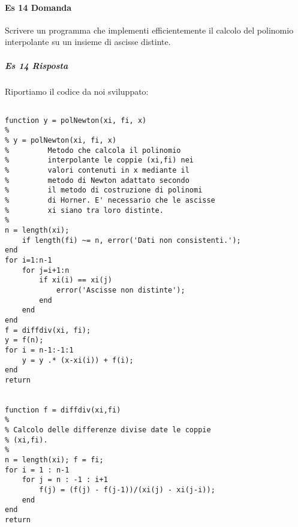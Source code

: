 \documentclass[a4paper]{report}
\begin{document}
\paragraph{Es 14 Domanda}
Scrivere un programma che implementi efficientemente il calcolo del polinomio interpolante su un insieme di ascisse distinte.
\subparagraph{Es 14 Risposta}
Riportiamo il codice da noi sviluppato:\\
\begin{lstlisting}

function y = polNewton(xi, fi, x)
%
% y = polNewton(xi, fi, x)
%         Metodo che calcola il polinomio 
%         interpolante le coppie (xi,fi) nei  
%         valori contenuti in x mediante il
%         metodo di Newton adattato secondo
%         il metodo di costruzione di polinomi
%         di Horner. E' necessario che le ascisse
%         xi siano tra loro distinte.
%
n = length(xi);
	if length(fi) ~= n, error('Dati non consistenti.');
end
for i=1:n-1
	for j=i+1:n
		if xi(i) == xi(j)
			error('Ascisse non distinte');
		end 
	end
end
f = diffdiv(xi, fi);
y = f(n);
for i = n-1:-1:1
	y = y .* (x-xi(i)) + f(i);
end
return


function f = diffdiv(xi,fi)
%
% Calcolo delle differenze divise date le coppie
% (xi,fi).
%
n = length(xi); f = fi;
for i = 1 : n-1
	for j = n : -1 : i+1
		f(j) = (f(j) - f(j-1))/(xi(j) - xi(j-i));
	end
end
return
\end{lstlisting}
\newpage
\end{document}
